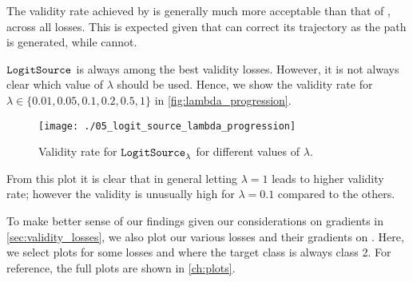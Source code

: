 \documentclass[../main.tex]{subfiles}
\begin{document}
The validity rate achieved by \revise{} is generally much more acceptable than that of \ls{}, across all losses.
This is expected given that \revise{} can correct its trajectory as the path is generated, while \ls{} cannot.

$\mathtt{LogitSource}_{}$ is always among the best validity losses.
However, it is not always clear which value of $\lambda$ should be used.
Hence, we show the validity rate for $\lambda \in \{ 0.01, 0.05, 0.1, 0.2, 0.5, 1\}$ in \autoref{fig:lambda_progression}.

\begin{figure}[htbp]
    \centering
\texttt{[image: ./05\_logit\_source\_lambda\_progression]}

    \caption{Validity rate for $\mathtt{LogitSource}_{\lambda}$ for different values of $\lambda$.}
    \label{fig:lambda_progression}
\end{figure}

From this plot it is clear that in general letting $\lambda = 1$ leads to higher validity rate;
however the validity is unusually high for $\lambda = 0.1$ compared to the others.

To make better sense of our findings given our considerations on gradients in \autoref{sec:validity_losses},
we also plot our various losses and their gradients on \CakeOnSea.
Here, we select plots for some losses and where the target class is always class 2.
For reference, the full plots are shown in \autoref{ch:plots}.



\end{document}
